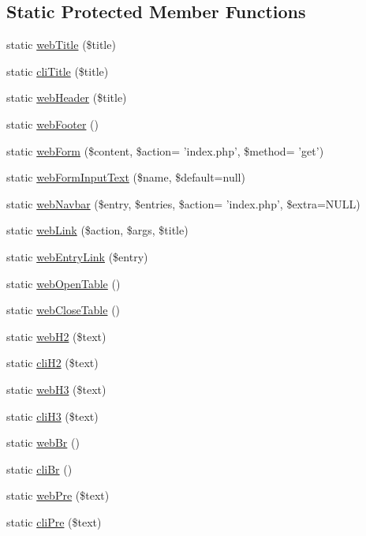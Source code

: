 \subsection*{Static Protected Member Functions}
\begin{DoxyCompactItemize}
\item 
static \hyperlink{classCinisisDisplayHelper_af3849efbba5e6980ddfdb4ceddb6ad17}{webTitle} (\$title)
\item 
static \hyperlink{classCinisisDisplayHelper_a8f0c8aec5b11a144b14278d287238c85}{cliTitle} (\$title)
\item 
static \hyperlink{classCinisisDisplayHelper_a356d8117dfcb220b7bb9996b569f5f25}{webHeader} (\$title)
\item 
static \hyperlink{classCinisisDisplayHelper_aa331cd95a86ffd270784736e74f253e6}{webFooter} ()
\item 
static \hyperlink{classCinisisDisplayHelper_a7ba5dd0ddd1ba9de5efdbfa1b62d4efa}{webForm} (\$content, \$action= 'index.php', \$method= 'get')
\item 
static \hyperlink{classCinisisDisplayHelper_a4c8934dc88cda9c7a894106b4dc7abba}{webFormInputText} (\$name, \$default=null)
\item 
static \hyperlink{classCinisisDisplayHelper_a291e2da97fd646e7fa34fb92879fc3d6}{webNavbar} (\$entry, \$entries, \$action= 'index.php', \$extra=NULL)
\item 
static \hyperlink{classCinisisDisplayHelper_aadc869909d8be43402d73fa3415827b4}{webLink} (\$action, \$args, \$title)
\item 
static \hyperlink{classCinisisDisplayHelper_a7ffe33c336d0b495807a2c4bae78cbfb}{webEntryLink} (\$entry)
\item 
static \hyperlink{classCinisisDisplayHelper_a4028def92d8511e525251ec7ab06246d}{webOpenTable} ()
\item 
static \hyperlink{classCinisisDisplayHelper_ab4e55ec58b59bc8b2af32b93cdf0d7c1}{webCloseTable} ()
\item 
static \hyperlink{classCinisisDisplayHelper_a0f2e5c78f6fdd146df04382e497cfe94}{webH2} (\$text)
\item 
static \hyperlink{classCinisisDisplayHelper_aa15ca1975a280814a1cdc2df82b8c67d}{cliH2} (\$text)
\item 
static \hyperlink{classCinisisDisplayHelper_acc20c726a214895584d15a434b2f3548}{webH3} (\$text)
\item 
static \hyperlink{classCinisisDisplayHelper_a1ed9ee357ffda8e2efd885a6eae20550}{cliH3} (\$text)
\item 
static \hyperlink{classCinisisDisplayHelper_a9c8b637e47e4263901baf4c5f2064d8d}{webBr} ()
\item 
static \hyperlink{classCinisisDisplayHelper_ad61db99c9d639678c96879aa34288323}{cliBr} ()
\item 
static \hyperlink{classCinisisDisplayHelper_a528283a8b16090918f1878dca5ee24fb}{webPre} (\$text)
\item 
static \hyperlink{classCinisisDisplayHelper_a50bf73bd3722766cbae1b46b3092453d}{cliPre} (\$text)
\end{DoxyCompactItemize}



